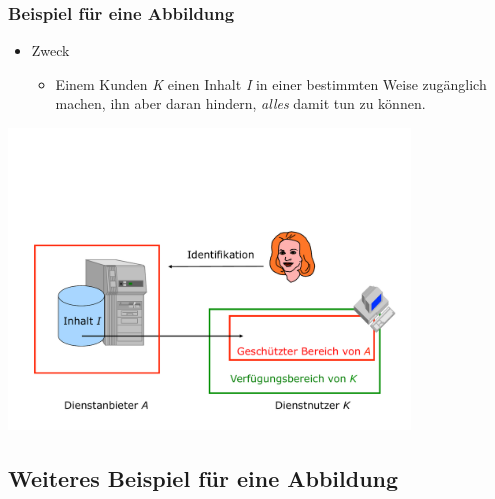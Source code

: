 \documentclass[t]{beamer}
\begin{document}
\begin{frame}
	\transwipe %
	\frametitle{Beispiel für eine Abbildung}
	\begin{itemize}
		\item Zweck
			\begin{itemize}
				\item Einem Kunden \emph{\color[RGB]{0,128,0} K} einen Inhalt \emph{\color{red} I} in einer bestimmten Weise zugänglich machen, ihn aber daran hindern, \emph{alles} damit tun zu können.
			\end{itemize}
	\end{itemize}
	\vspace{\fill}
	\begin{center}
		\includegraphics[width=0.8\textwidth]{../pic/abbildung2.pdf}
	\end{center}
\end{frame}

\subsection{Weiteres Beispiel für eine Abbildung} %
\end{document}
